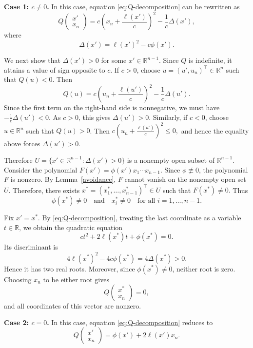 \documentclass[12pt,reqno]{amsart}
\theoremstyle{definition}
\numberwithin{equation}{subsection}
\newenvironment{pf}{\proof}{\endproof}
\numberwithin{equation}{section}
\begin{document}
\begin{pf}
\noindent\textbf{Case 1: $c\neq 0$.}
In this case, equation \eqref{eq:Q-decomposition} can be rewritten as
\[
Q\begin{pmatrix}x'\\x_n\end{pmatrix}
=
c\left(x_n+\frac{\ell(x')}{c}\right)^2
-\frac{1}{c}\Delta(x'),
\]
where
\[
\Delta(x')=\ell(x')^2-c\phi(x').
\]

We next show that $\Delta(x')>0$ for some
$x'\in\mathbb R^{n-1}$. Since $Q$ is indefinite, it
attains a value of sign opposite to $c$. If $c>0$, choose
$u=(u',u_n)^\top\in\mathbb{R}^n$ such that $Q(u)<0$. Then
\[
Q(u)=
c\left(u_n+\frac{\ell(u')}{c}\right)^2
-\frac{1}{c}\Delta(u').
\]
Since the first term on the right-hand side is nonnegative, we must have
\(
-\frac{1}{c}\Delta(u')<0.
\)
As $c>0$, this gives $\Delta(u')>0$.
Similarly, if $c<0$, choose $u\in\mathbb{R}^n$ such that $Q(u)>0$. Then
\(
c\left(u_n+\frac{\ell(u')}{c}\right)^2\le 0,
\)
and hence the equality above forces $\Delta(u')>0$.

Therefore
\(
U=\{x'\in\mathbb{R}^{n-1}:\Delta(x')>0\}
\)
is a nonempty open subset of $\mathbb{R}^{n-1}$.
Consider the polynomial
\(
F(x')=\phi(x')x_1\cdots x_{n-1}.
\)
Since $\phi\not\equiv 0$, the polynomial $F$ is nonzero. By
Lemma~\ref{avoidance}, $F$ cannot vanish on the nonempty open set $U$.
Therefore, there exists
\(
x^\ast=(x_1^\ast,\dots,x_{n-1}^\ast)^\top\in U
\)
such that
\(
F(x^\ast)\neq 0.
\)
Thus
\[
\phi(x^\ast)\neq 0
\quad\text{and}\quad
x_i^\ast\neq 0
\quad\text{for all } i=1,\dots,n-1.
\]

Fix \(x'=x^\ast\). By \eqref{eq:Q-decomposition}, treating the last coordinate as a variable
\(t\in\mathbb{R}\), we obtain the quadratic equation
\[
ct^2+2\ell(x^\ast)t+\phi(x^\ast)=0.
\]
Its discriminant is
\[
4\ell(x^\ast)^2-4c\phi(x^\ast)=4\Delta(x^\ast)>0.
\]
Hence it has two real roots. Moreover, since $\phi(x^\ast)\neq 0$, neither
root is zero. Choosing $x_n$ to be either root gives
\[
Q\begin{pmatrix}x^\ast\\x_n\end{pmatrix}=0,
\]
and all coordinates of this vector are nonzero.

\medskip

\noindent\textbf{Case 2: $c=0$.}
In this case, equation \eqref{eq:Q-decomposition} reduces to
\[
Q\begin{pmatrix}x'\\x_n\end{pmatrix}
=
\phi(x')+2\ell(x')x_n.
\]


\end{pf}
\end{document}
